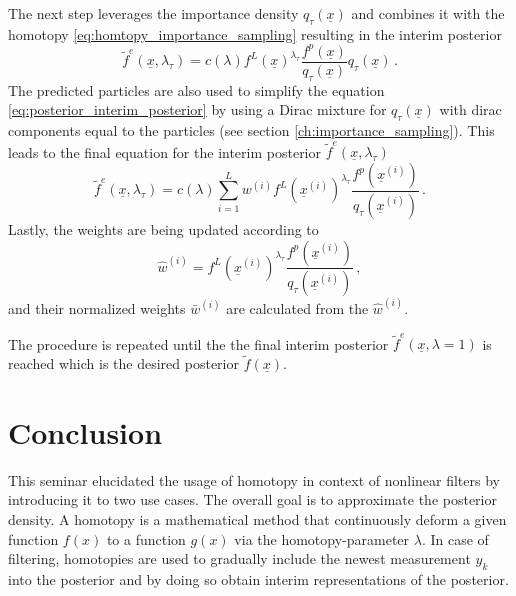 \documentclass[a4paper]{IEEEtran}
\begin{document}
The next step leverages the importance density $q_{\tau}(\underline{x})$ and
combines it with the homotopy \eqref{eq:homtopy_importance_sampling} resulting in the interim posterior
\begin{equation}
    \tilde{f}^{e}(\underline{x}, \lambda_{\tau}) = c(\lambda)f^L(\underline{x})^{\lambda_{\tau}}\frac{f^p(\underline{x})}{q_{\tau}(\underline{x})}q_{\tau}(\underline{x}) \,.
    \label{eq:posterior_interim_posterior}
\end{equation}
The predicted particles are also used to simplify the equation \eqref{eq:posterior_interim_posterior} by using a Dirac mixture for $q_{\tau}(\underline{x})$ with dirac components equal to the particles (see section \ref{ch:importance_sampling}).
This leads to the final equation for the interim posterior $\tilde{f}^{e}(\underline{x}, \lambda_{\tau})$
\begin{equation}
    \tilde{f}^{e}(\underline{x}, \lambda_{\tau}) = c(\lambda) \sum_{i=1}^{L}w^{(i)}f^L(\underline{x}^{(i)})^{\lambda_{\tau}}\frac{f^p(\underline{x}^{(i)})}{q_{\tau}(\underline{x}^{(i)})} \,.
    \label{eq:posterior_interim_posterior}
\end{equation}
Lastly, the weights are being updated according to
\begin{equation}
    \hat{w}^{(i)}= f^L(\underline{x}^{(i)})^{\lambda_{\tau}}\frac{f^p(\underline{x}^{(i)})}{q_{\tau}(\underline{x}^{(i)})} \,,
    \label{eq:posterior_update_weights}
\end{equation}
and their normalized weights $\bar{w}^{(i)}$ are calculated from the $\hat{w}^{(i)}$.

The procedure is repeated until the the final interim posterior $\tilde{f}^{e}(\underline{x}, \lambda=1)$ is reached which is the desired posterior $\tilde{f}(\underline{x})$.

\section{Conclusion}
\label{ch:conclusion}
This seminar elucidated the usage of homotopy in context of nonlinear filters by introducing it to two use cases. The overall goal is to approximate the posterior density. 
A homotopy is a mathematical method that continuously deform a given function $f(x)$ to a function $g(x)$ via the homotopy-parameter $\lambda$.
In case of filtering, homotopies are used to gradually include the newest measurement $y_{k}$ into the posterior and by doing so obtain interim representations of the posterior.
\end{document}
